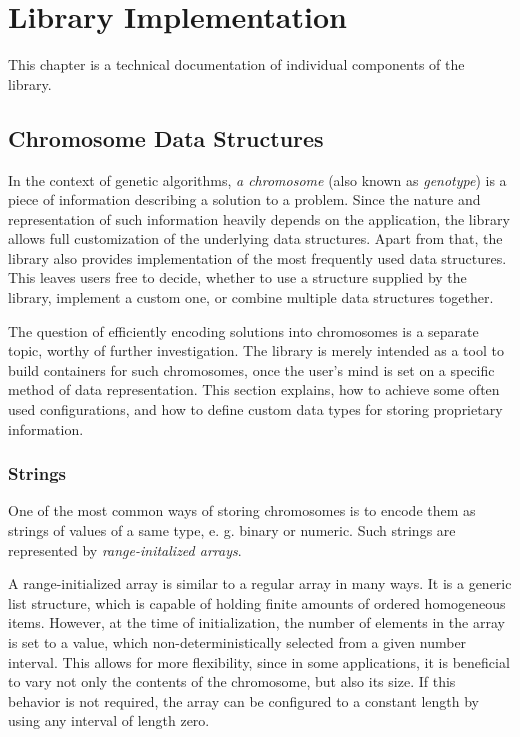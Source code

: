 \chapter{Library Implementation}
This chapter is a technical documentation of individual components of the library.

\section{Chromosome Data Structures}
In the context of genetic algorithms, \textit{a chromosome} (also known as \textit{genotype}) is a piece of information describing a solution to a problem. Since the nature and representation of such information heavily depends on the application, the library allows full customization of the underlying data structures. Apart from that, the library also provides implementation of the most frequently used data structures. This leaves users free to decide, whether to use a structure supplied by the library, implement a custom one, or combine multiple data structures together.

The question of efficiently encoding solutions into chromosomes is a separate topic, worthy of further investigation. The library is merely intended as a tool to build containers for such chromosomes, once the user's mind is set on a specific method of data representation. This section explains, how to achieve some often used configurations, and how to define custom data types for storing proprietary information.

\subsection{Strings}\label{section:strings}
One of the most common ways of storing chromosomes is to encode them as strings of values of a same type, e. g. binary or numeric. Such strings are represented by \textit{range-initalized arrays}.

A range-initialized array is similar to a regular array in many ways. It is a generic list structure, which is capable of holding finite amounts of ordered homogeneous items. However, at the time of initialization, the number of elements in the array is set to a value, which non-deterministically selected from a given number interval. This allows for more flexibility, since in some applications, it is beneficial to vary not only the contents of the chromosome, but also its size. If this behavior is not required, the array can be configured to a constant length by using any interval of length zero.

